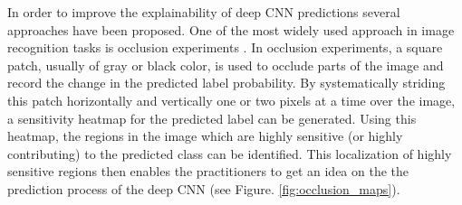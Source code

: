 In order to improve the explainability of deep CNN predictions several approaches have been proposed.
One of the most widely used approach in image recognition tasks is occlusion experiments \cite{zeiler2014visualizing}.
In occlusion experiments, a square patch, usually of gray or black color, is used to occlude parts of the image and record the change in the predicted label probability.
By systematically striding this patch horizontally and vertically one or two pixels at a time over the image, a sensitivity heatmap for the predicted label can be generated.
Using this heatmap, the regions in the image which are highly sensitive (or highly contributing) to the predicted class can be identified.
This localization of highly sensitive regions then enables the practitioners to get an idea on the the prediction process of the deep CNN (see Figure. \ref{fig:occlusion_maps}).

